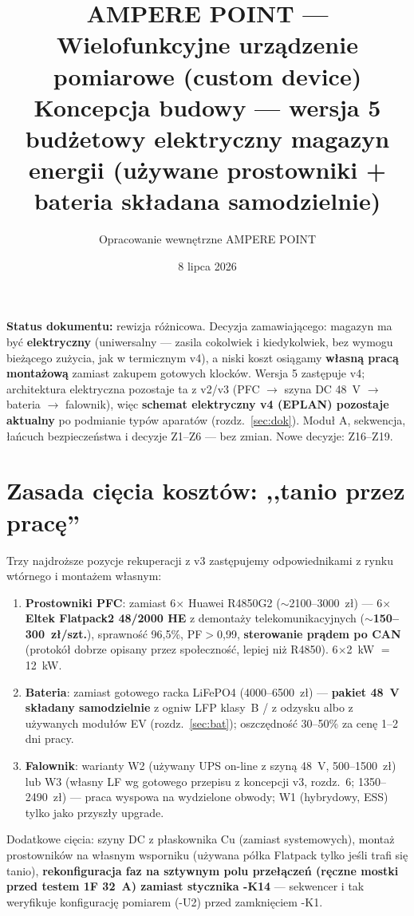 \documentclass[11pt,a4paper]{article}
\title{\textbf{AMPERE POINT --- Wielofunkcyjne urządzenie pomiarowe (custom device)}\\[4pt]
\large Koncepcja budowy --- wersja 5\\
budżetowy \textbf{elektryczny} magazyn energii (używane prostowniki + bateria składana samodzielnie)}
\author{Opracowanie wewnętrzne AMPERE POINT}
\date{8 lipca 2026}
\begin{document}
\maketitle
\vspace{-1.5em}

\noindent\textbf{Status dokumentu:} rewizja różnicowa. Decyzja zamawiającego: magazyn ma być
\textbf{elektryczny} (uniwersalny --- zasila cokolwiek i kiedykolwiek, bez wymogu bieżącego zużycia,
jak w termicznym v4), a niski koszt osiągamy \textbf{własną pracą montażową} zamiast zakupem
gotowych klocków. Wersja 5 zastępuje v4; architektura elektryczna pozostaje ta z v2/v3
(PFC $\to$ szyna DC 48~V $\to$ bateria $\to$ falownik), więc \textbf{schemat elektryczny v4 (EPLAN)
pozostaje aktualny} po podmianie typów aparatów (rozdz.~\ref{sec:dok}). Moduł A, sekwencja,
łańcuch bezpieczeństwa i decyzje Z1--Z6 --- bez zmian. Nowe decyzje: Z16--Z19.

\tableofcontents

\section{Zasada cięcia kosztów: ,,tanio przez pracę''}
Trzy najdroższe pozycje rekuperacji z v3 zastępujemy odpowiednikami z rynku wtórnego i montażem
własnym:
\begin{enumerate}
\item \textbf{Prostowniki PFC}: zamiast 6$\times$ Huawei R4850G2 ($\sim$2100--3000~zł) ---
6$\times$ \textbf{Eltek Flatpack2 48/2000 HE} z demontaży telekomunikacyjnych
(\textbf{$\sim$150--300~zł/szt.}), sprawność 96{,}5\%, PF$>$0,99, \textbf{sterowanie prądem po CAN}
(protokół dobrze opisany przez społeczność, lepiej niż R4850). 6$\times$2~kW $=$ 12~kW.
\item \textbf{Bateria}: zamiast gotowego racka LiFePO4 (4000--6500~zł) --- \textbf{pakiet 48~V
składany samodzielnie} z ogniw LFP klasy~B / z odzysku albo z używanych modułów EV
(rozdz.~\ref{sec:bat}); oszczędność 30--50\% za cenę 1--2 dni pracy.
\item \textbf{Falownik}: warianty W2 (używany UPS on-line z szyną 48~V, 500--1500~zł) lub W3
(własny LF wg gotowego przepisu z koncepcji v3, rozdz.~6; 1350--2490~zł) --- praca wyspowa na
wydzielone obwody; W1 (hybrydowy, ESS) tylko jako przyszły upgrade.
\end{enumerate}
Dodatkowe cięcia: szyny DC z płaskownika Cu (zamiast systemowych), montaż prostowników na
własnym wsporniku (używana półka Flatpack tylko jeśli trafi się tanio), \textbf{rekonfiguracja
faz na sztywnym polu przełączeń (ręczne mostki przed testem 1F 32~A) zamiast stycznika -K14} ---
sekwencer i tak weryfikuje konfigurację pomiarem (-U2) przed zamknięciem -K1.
\end{document}
